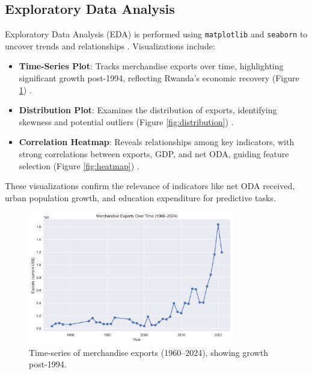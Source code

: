 \documentclass[12pt]{article}
\begin{document}
	\subsection{Exploratory Data Analysis}
	Exploratory Data Analysis (EDA) is performed using \texttt{matplotlib} and \texttt{seaborn} to uncover trends and relationships \citep{matplotlib, seaborn}. Visualizations include:
	\begin{itemize}
		\item \textbf{Time-Series Plot}: Tracks merchandise exports over time, highlighting significant growth post-1994, reflecting Rwanda's economic recovery (Figure \ref{fig:timeseries}) \citep{rwanda_vision}.
		\item \textbf{Distribution Plot}: Examines the distribution of exports, identifying skewness and potential outliers (Figure \ref{fig:distribution}) \citep{seaborn}.
		\item \textbf{Correlation Heatmap}: Reveals relationships among key indicators, with strong correlations between exports, GDP, and net ODA, guiding feature selection (Figure \ref{fig:heatmap}) \citep{hastie}.
	\end{itemize}
	These visualizations confirm the relevance of indicators like net ODA received, urban population growth, and education expenditure for predictive tasks.
	
	\begin{figure}[H]
		\centering
		\includegraphics[width=0.8\textwidth]{../timeseries.png}
		\caption{Time-series of merchandise exports (1960–2024), showing growth post-1994.}
		\label{fig:timeseries}
	\end{figure}
	
\end{document}

